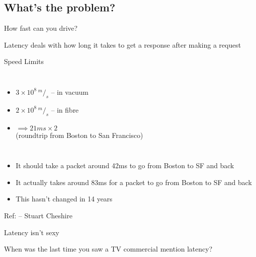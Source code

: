 \documentclass{beamer}
\begin{document}
\subsection{What's the problem?}

\begin{frame}{How fast can you drive?}
  \begin{center}
  Latency deals with how long it takes to get a response after making a request
  \end{center}
\end{frame}

\begin{frame}{Speed Limits}
  \begin{columns}[t]
  \begin{itemize}
  \item $ 3 \times 10^8 \,^m/_s $ -- in vacuum
  \item $ 2 \times 10^8 \,^m/_s $ -- in fibre
  \item $ \implies 21ms \times 2 $ \\  (roundtrip from Boston to San Francisco)
  \end{itemize}
  \end{columns}
\end{frame}

\begin{frame}{42}
  \begin{itemize}
  \item It should take a packet around 42ms to go from Boston to SF and back 
  \item It actually takes around 83ms for a packet to go from Boston to SF and back
  \item<2-> This hasn't changed in 14 years
  \end{itemize}
  \vfill
  \tiny{Ref: \href{http://www.stuartcheshire.org/rants/Latency.html}{} -- Stuart Cheshire}
\end{frame}

\begin{frame}{Latency isn't sexy}
  \begin{center}
  When was the last time you saw a TV commercial mention latency?
  \end{center}
\end{frame}
\end{document}
